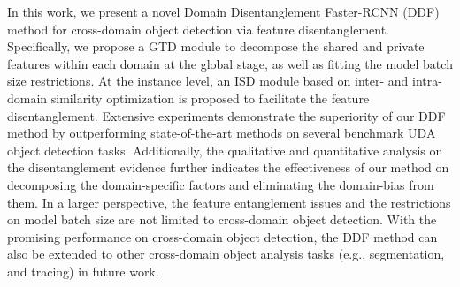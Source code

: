 \documentclass[journal]{IEEEtran}
\begin{document}
In this work, we present a novel Domain Disentanglement Faster-RCNN (DDF) method for cross-domain object detection via feature disentanglement. Specifically, we propose a GTD module to decompose the shared and private features within each domain at the global stage, as well as fitting the model batch size restrictions. At the instance level, an ISD module based on inter- and intra-domain similarity optimization is proposed to facilitate the feature disentanglement. Extensive experiments demonstrate the superiority of our DDF method by outperforming state-of-the-art methods on several benchmark UDA object detection tasks. Additionally, the qualitative and quantitative analysis on the disentanglement evidence further indicates the effectiveness of our method on decomposing the domain-specific factors and eliminating the domain-bias from them. In a larger perspective, the feature entanglement issues and the restrictions on model batch size are not limited to cross-domain object detection. With the promising performance on cross-domain object detection, the DDF method can also be extended to other cross-domain object analysis tasks (e.g., segmentation, and tracing) in future work.

{\small




}
\end{document}

